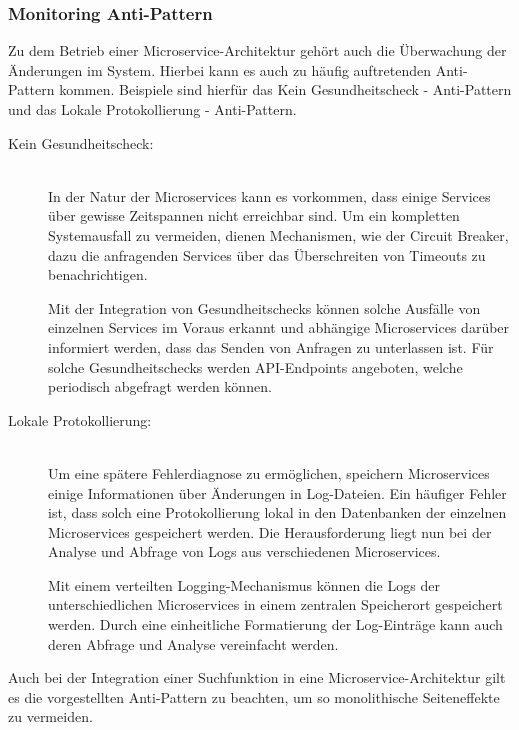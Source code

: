 \subsubsection*{Monitoring Anti-Pattern}

Zu dem Betrieb einer Microservice-Architektur gehört auch die Überwachung der Änderungen im System. Hierbei kann es auch zu häufig auftretenden Anti-Pattern kommen. Beispiele sind hierfür das \glqq Kein Gesundheitscheck\grqq{} - Anti-Pattern und das \glqq Lokale Protokollierung\grqq{} - Anti-Pattern.

\begin{description}
    \item[Kein Gesundheitscheck:]\hfill \\
    In der Natur der Microservices kann es vorkommen, dass einige Services über gewisse Zeitspannen nicht erreichbar sind. Um ein kompletten Systemausfall zu vermeiden, dienen Mechanismen, wie der Circuit Breaker, dazu die anfragenden Services über das Überschreiten von Timeouts zu benachrichtigen.

    Mit der Integration von Gesundheitschecks können solche Ausfälle von einzelnen Services im Voraus erkannt und abhängige Microservices darüber informiert werden, dass das Senden von Anfragen zu unterlassen ist. Für solche Gesundheitschecks werden API-Endpoints angeboten, welche periodisch abgefragt werden können.
    
    \item[Lokale Protokollierung:]\hfill \\
    Um eine spätere Fehlerdiagnose zu ermöglichen, speichern Microservices einige Informationen über Änderungen in Log-Dateien. Ein häufiger Fehler ist, dass solch eine Protokollierung lokal in den Datenbanken der einzelnen Microservices gespeichert werden. Die Herausforderung liegt nun bei der Analyse und Abfrage von Logs aus verschiedenen Microservices.

    Mit einem verteilten Logging-Mechanismus können die Logs der unterschiedlichen Microservices in einem zentralen Speicherort gespeichert werden. Durch eine einheitliche Formatierung der Log-Einträge kann auch deren Abfrage und Analyse vereinfacht werden.

\end{description}

Auch bei der Integration einer Suchfunktion in eine Microservice-Architektur gilt es die vorgestellten Anti-Pattern zu beachten, um so monolithische Seiteneffekte zu vermeiden.

